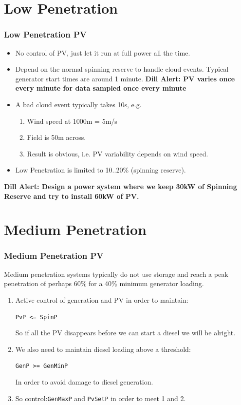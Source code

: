 \documentclass{beamer}
\def\dill#1{\textcolor{RawSienna}{\textbf{Dill Alert: #1}}}
\begin{document}
\section{Low Penetration}
\begin{frame}\frametitle{Low Penetration PV}
  \begin{itemize}
  \item No control of PV, just let it run at full power all the time.
    \pause
  \item Depend on the normal spinning reserve to handle
    cloud events. Typical generator start times are around 1 minute.
    \pause
    \dill{PV varies once every minute for data sampled once 
      every minute}
    \pause
  \item A bad cloud event typically takes 10s, e.g.
    \begin{enumerate}
    \item Wind speed at 1000m = 5m/s
    \item Field is 50m across.
    \item Result is obvious, i.e. PV variability depends on wind speed.
    \end{enumerate}
  \item Low Penetration is limited to 10..20\% (spinning reserve).
  \end{itemize}
  \dill{Design a power system where we keep 30kW of
    Spinning Reserve and try to install 60kW of PV.}
\end{frame}

\section{Medium Penetration}
\begin{frame}\frametitle{Medium Penetration PV}
Medium penetration systems typically do not use storage and
reach a peak penetration of perhaps 60\% for a 40\% minimum generator
loading.
\pause
  \begin{enumerate}
  \item Active control of generation and PV in order to maintain:
    
    \texttt{PvP <= SpinP}

    So if all the PV disappears before we can start a diesel we will
    be alright.
    \pause
  \item We also need to maintain diesel loading above a threshold:
    
    \texttt{GenP >= GenMinP}

    In order to avoid damage to diesel generation.
    \pause
  \item So control:\texttt{GenMaxP} and \texttt{PvSetP} in order to
    meet 1 and 2.
  \end{enumerate}
\end{frame}
\end{document}
